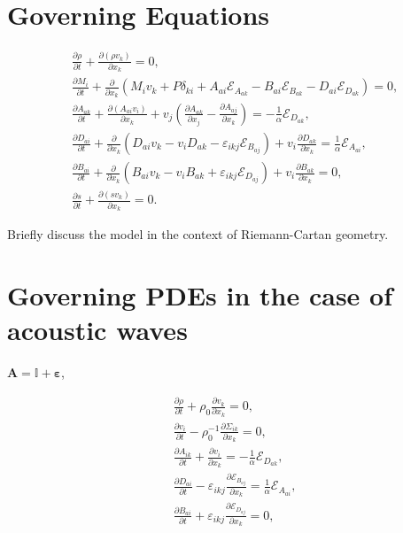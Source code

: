 \documentclass[
10pt, %
a4paper, %
oneside, %
headinclude,footinclude, %
BCOR5mm, %
]{scrartcl}
\newcommand{\calE}{\mathcal{E}}						%
\newcommand{\pd}{\partial}
\newcommand{\dist}[2]{ A_{{#1}{#2}} }	%
\newcommand{\burg}[1]{ B_{#1} }	%
\newcommand{\veps}{\varepsilon}
\begin{document}
\section{Governing Equations}
\begin{subequations}\label{PDE}
    \begin{align}
        &\frac{\pd \rho}{\pd t} + \frac{\pd(\rho v_k)}{\pd x_k} = 0,\label{PDE.rho}\\[1mm]
        &\frac{\pd M_i}{\pd t} + \frac{ \pd }{\pd x_k}  \left( M_i v_k + P \delta_{ki} + \dist{a}{i}
        \calE_{\dist{a}{k}} - B_{ai} \calE_{B_{ak}} - D_{ai} \calE_{D_{ak}}
        \right ) = 0,\label{PDE.M}\\[2mm]
        &\frac{\pd \dist{a}{k}}{\pd t} +\frac{\pd (  {\dist{a}{i} v_i}  )}{\pd x_k} + 
        v_j \left(\frac{\pd \dist{a}{k}}{\pd x_j} - \frac{\pd\dist{a}{j}}{\pd x_k}\right) =         
        -\frac{1}{\alpha}\calE_{D_{ak}},\label{PDE.A}\\[2mm]
        &\frac{\pd D_{ai}}{\pd t} + \frac{\pd} {\pd x_k} \left( D_{ai} v_k  -  v_i D_{a k} - \veps_{i k
        j}  \calE_{B_{a j}} \right) + v_i \frac{\pd D_{a k}}{\pd x_k}  =
        \frac{1}{\alpha}\calE_{\dist{a}{i}},\label{PDE.D}\\[2mm]
        &\frac{\pd \burg{ai}}{\pd t} + \frac{\pd}{\pd x_k} \left(
        \burg{ai} v_k - v_i \burg{ak} + \varepsilon _{ikj} \calE_{D_{aj}}
        \right) + v_i \frac{\pd \burg{ak}}{\pd x_k} = 0,\label{PDE.B}\\[2mm]
        &\frac{\pd s}{\pd t} + \frac{\pd (s v_k)}{\pd x_k} = 0.\label{PDE.s}
    \end{align}
\end{subequations}

Briefly discuss the model in the context of Riemann-Cartan geometry.



\section{Governing PDEs in the case of acoustic waves}

$ \bm{A} = \mathbb{I} + \bm{\veps} $, 

\begin{subequations}\label{PDE.lin}
    \begin{align}
        &\frac{\pd \rho}{\pd t} + \rho_0\frac{\pd v_k}{\pd x_k} = 0,\label{PDE.lin.rho}\\[1mm]
        &\frac{\pd v_i}{\pd t} - \rho_0^{-1}\frac{ \pd \Sigma_{ik}}{\pd x_k}   = 
        0,\label{PDE.lin.M}\\[2mm]
        &\frac{\pd \dist{i}{k}}{\pd t} + \frac{\pd v_i}{\pd x_k} =         
        -\frac{1}{\alpha}\calE_{D_{ak}},\label{PDE.lin.A}\\[2mm]
        &\frac{\pd D_{ai}}{\pd t} - \veps_{i k j} \frac{\pd \calE_{B_{a j}}} {\pd x_k} 
        =
        \frac{1}{\alpha}\calE_{\dist{a}{i}},\label{PDE.lin.D}\\[2mm]
        &\frac{\pd \burg{ai}}{\pd t} +  \veps_{ikj} \frac{\pd\calE_{D_{aj}}}{\pd x_k}  = 
        0,\label{PDE.lin.B}
    \end{align}
\end{subequations}
\end{document}
